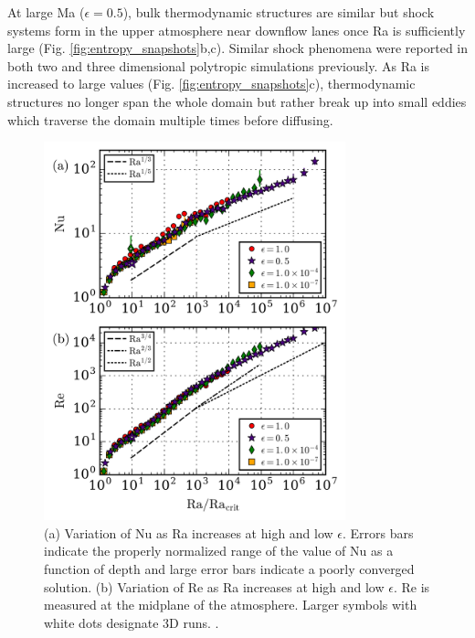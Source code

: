 \documentclass[aps, prl, twocolumn, nofootinbib, groupedaddress, amsfonts, amssymb, amsmath]{revtex4-1}
\begin{document}
At large Ma ($\epsilon = 0.5$), bulk thermodynamic structures are similar but
shock systems form in the upper atmosphere near downflow lanes 
once Ra is sufficiently large  (Fig. \ref{fig:entropy_snapshots}b,c).
Similar shock phenomena were reported in
both two \cite{cattaneo&all1990} and 
three \cite{malagoli&all1990} dimensional polytropic simulations previously.
As Ra is increased to large values 
(Fig. \ref{fig:entropy_snapshots}c), thermodynamic structures 
no longer span the whole domain but rather break up into 
small eddies which traverse the domain multiple
times before diffusing.  

\begin{figure}[t]
\includegraphics[width=3.4375in]{./figs/re_and_nu_v_Ra.png}
\caption{
(a) Variation of Nu as Ra increases at high and low $\epsilon$. 
Errors bars indicate the properly normalized range of the
value of Nu as a function of depth and
large error bars indicate a poorly converged solution.
(b) Variation of Re as Ra increases at high and low $\epsilon$.
Re is measured at the midplane of the atmosphere.
Larger symbols with white dots designate 3D runs.
 \label{fig:re_and_nu_v_ra}.
}
\end{figure}
\end{document}
